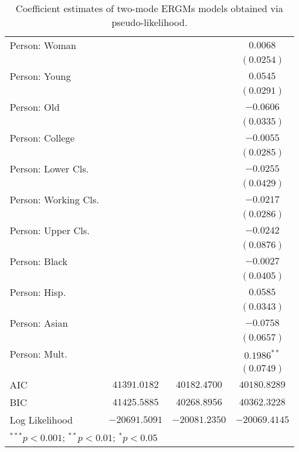 \begin{table}
\begin{center}
\begin{tabular}{l c c c}
Person: Woman        &                 &                 & $0.0068$        \\
                     &                 &                 & $(0.0254)$      \\
Person: Young        &                 &                 & $0.0545$        \\
                     &                 &                 & $(0.0291)$      \\
Person: Old          &                 &                 & $-0.0606$       \\
                     &                 &                 & $(0.0335)$      \\
Person: College      &                 &                 & $-0.0055$       \\
                     &                 &                 & $(0.0285)$      \\
Person: Lower Cls.   &                 &                 & $-0.0255$       \\
                     &                 &                 & $(0.0429)$      \\
Person: Working Cls. &                 &                 & $-0.0217$       \\
                     &                 &                 & $(0.0286)$      \\
Person: Upper Cls.   &                 &                 & $-0.0242$       \\
                     &                 &                 & $(0.0876)$      \\
Person: Black        &                 &                 & $-0.0027$       \\
                     &                 &                 & $(0.0405)$      \\
Person: Hisp.        &                 &                 & $0.0585$        \\
                     &                 &                 & $(0.0343)$      \\
Person: Asian        &                 &                 & $-0.0758$       \\
                     &                 &                 & $(0.0657)$      \\
Person: Mult.        &                 &                 & $0.1986^{**}$   \\
                     &                 &                 & $(0.0749)$      \\
\midrule
AIC                  & $41391.0182$    & $40182.4700$    & $40180.8289$    \\
BIC                  & $41425.5885$    & $40268.8956$    & $40362.3228$    \\
Log Likelihood       & $-20691.5091$   & $-20081.2350$   & $-20069.4145$   \\
\bottomrule
\multicolumn{4}{l}{\scriptsize{$^{***}p<0.001$; $^{**}p<0.01$; $^{*}p<0.05$}}
\end{tabular}
\caption{Coefficient estimates of two-mode ERGMs models obtained via pseudo-likelihood.}
\label{tab:reg1}
\end{center}
\end{table}
